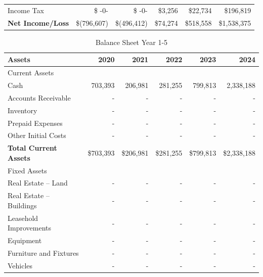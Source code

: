 \documentclass[10pt,openany]{book}
\begin{document}
\begin{landscape}
\begin{center}
\begin{longtable}[\textwidth]{@{}p{10cm}rrrrr@{}}
      \hspace{3mm} Income Tax & \$ -0- & \$ -0- & \$3,256 & \$22,734 & \$196,819 \\
      \textbf{Net Income/Loss} & \$(796,607) & \$(496,412) & \$74,274 & \$518,558 & \$1,538,375 \\
      \bottomrule
    \end{longtable}
    \begin{longtable}[\textwidth]{@{}p{10cm}rrrrr@{}}
      \caption{Balance Sheet Year 1-5}\tabularnewline
      \toprule
      \textbf{Assets} & 2020 & 2021 & 2022 & 2023 & 2024 \\
      \midrule
      \hspace{0mm} Current Assets & & & & & \\
      \hspace{3mm} Cash & 703,393 & 206,981 & 281,255 & 799,813 & 2,338,188 \\
      \hspace{3mm} Accounts Receivable & - & - & - & - & - \\
      \hspace{3mm} Inventory & - & - & - & - & - \\
      \hspace{3mm} Prepaid Expenses & - & - & - & - & - \\
      \hspace{3mm} Other Initial Costs & - & - & - & - & - \\
      \hfill \textbf{Total Current Assets} & \$703,393 & \$206,981 & \$281,255 & \$799,813 & \$2,338,188 \\
      \hspace{0mm} Fixed Assets & & & & & \\
      \hspace{3mm} Real Estate -- Land & - & - & - & - & - \\
      \hspace{3mm} Real Estate -- Buildings & - & - & - & - & - \\
      \hspace{3mm} Leasehold Improvements & - & - & - & - & - \\
      \hspace{3mm} Equipment & - & - & - & - & - \\
      \hspace{3mm} Furniture and Fixtures & - & - & - & - & - \\
      \hspace{3mm} Vehicles & - & - & - & - & - \\

\end{longtable}
\end{center}
\end{landscape}
\end{document}
